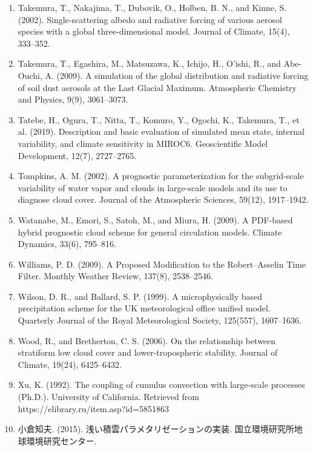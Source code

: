 \begin{enumerate}
\item Takemura, T., Nakajima, T., Dubovik, O., Holben, B. N., and Kinne, S. (2002). Single-scattering albedo and radiative forcing of various aerosol species with a global three-dimensional model. Journal of Climate, 15(4), 333–352.
\item Takemura, T., Egashira, M., Matsuzawa, K., Ichijo, H., O’ishi, R., and Abe-Ouchi, A. (2009). A simulation of the global distribution and radiative forcing of soil dust aerosols at the Last Glacial Maximum. Atmospheric Chemistry and Physics, 9(9), 3061–3073.
\item Tatebe, H., Ogura, T., Nitta, T., Komuro, Y., Ogochi, K., Takemura, T., et al. (2019). Description and basic evaluation of simulated mean state, internal variability, and climate sensitivity in MIROC6. Geoscientific Model Development, 12(7), 2727–2765.
\item Tompkins, A. M. (2002). A prognostic parameterization for the subgrid-scale variability of water vapor and clouds in large-scale models and its use to diagnose cloud cover. Journal of the Atmospheric Sciences, 59(12), 1917–1942.
\item Watanabe, M., Emori, S., Satoh, M., and Miura, H. (2009). A PDF-based hybrid prognostic cloud scheme for general circulation models. Climate Dynamics, 33(6), 795–816.
\item Williams, P. D. (2009). A Proposed Modification to the Robert–Asselin Time Filter. Monthly Weather Review, 137(8), 2538–2546.
\item Wilson, D. R., and Ballard, S. P. (1999). A microphysically based precipitation scheme for the UK meteorological office unified model. Quarterly Journal of the Royal Meteorological Society, 125(557), 1607–1636.
\item Wood, R., and Bretherton, C. S. (2006). On the relationship between stratiform low cloud cover and lower-tropospheric stability. Journal of Climate, 19(24), 6425–6432.
\item Xu, K. (1992). The coupling of cumulus convection with large-scale processes (Ph.D.). University of California. Retrieved from https://elibrary.ru/item.asp?id=5851863
\item 小倉知夫. (2015). 浅い積雲パラメタリゼーションの実装. 国立環境研究所地球環境研究センター.
\end{enumerate}
